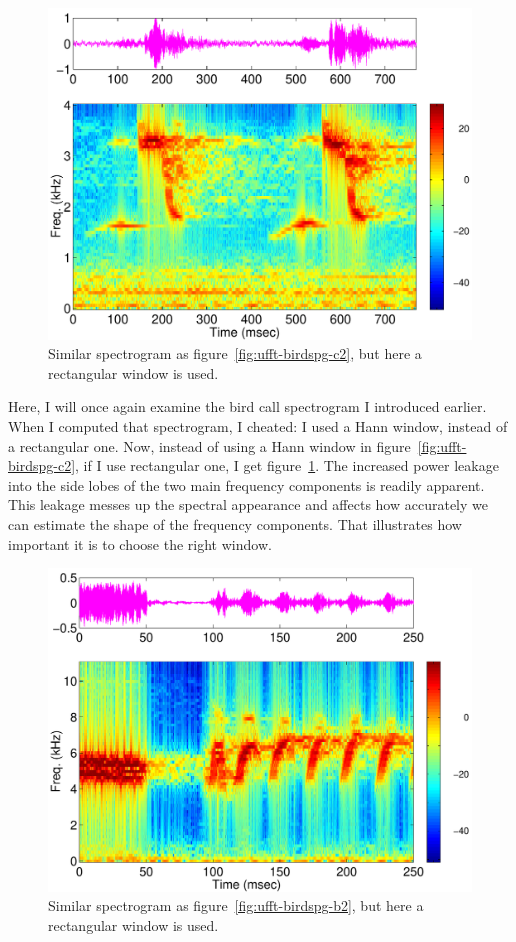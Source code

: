 \begin{figure}
\centerline{\includegraphics[height=0.35\textheight]{ch-fft/ufft_cardinal1_spg128_127rect}}
\caption{Similar spectrogram as
figure~\protect\ref{fig:ufft-birdspg-c2}, but here a rectangular
window is used.\label{fig:ufft-birdspg-c3}}
\end{figure}

Here, I will once again examine the bird call spectrogram I introduced
earlier. When I computed that spectrogram, I cheated: I used a Hann
window, instead of a rectangular one. Now, instead of using a Hann
window in figure~\ref{fig:ufft-birdspg-c2}, if I use rectangular one,
I get figure~\ref{fig:ufft-birdspg-c3}. The increased power leakage
into the side lobes of the two main frequency components is readily
apparent. This leakage messes up the spectral appearance and affects
how accurately we can estimate the shape of the frequency components.
That illustrates how important it is to choose the right window.

\begin{figure}
\centerline{\includegraphics[height=0.5\textheight]{ch-fft/ufft_bluewing1am_spg128_127rect}}
\caption{Similar spectrogram as figure~\ref{fig:ufft-birdspg-b2}, but
here a rectangular window is used.\label{fig:ufft-birdspg-b3}}
\end{figure}

